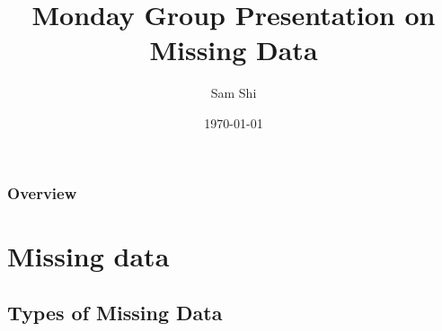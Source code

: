 \documentclass{beamer}
\title[Missing Data]{Monday Group Presentation on Missing Data} %
\author{Sam Shi} %
\institute[Ryerson] %
{
Ryerson University \\ %
\medskip
}
\date{\today} %
\begin{document}
\begin{frame}
\titlepage %
\end{frame}

\begin{frame}
\frametitle{Overview} %
\tableofcontents %
\end{frame}


\section{Missing data} %

\subsection{Types of Missing Data} %
\end{document}
